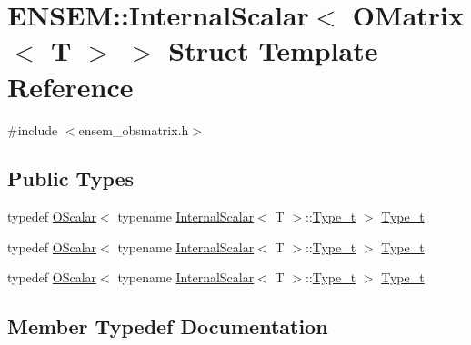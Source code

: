 \hypertarget{structENSEM_1_1InternalScalar_3_01OMatrix_3_01T_01_4_01_4}{}\section{E\+N\+S\+EM\+:\+:Internal\+Scalar$<$ O\+Matrix$<$ T $>$ $>$ Struct Template Reference}
\label{structENSEM_1_1InternalScalar_3_01OMatrix_3_01T_01_4_01_4}


{\ttfamily \#include $<$ensem\+\_\+obsmatrix.\+h$>$}

\subsection*{Public Types}
\begin{DoxyCompactItemize}
\item 
typedef \mbox{\hyperlink{classENSEM_1_1OScalar}{O\+Scalar}}$<$ typename \mbox{\hyperlink{structENSEM_1_1InternalScalar}{Internal\+Scalar}}$<$ T $>$\+::\mbox{\hyperlink{structENSEM_1_1InternalScalar_3_01OMatrix_3_01T_01_4_01_4_a1e1ab78c916da9274cc273535dd0a08a}{Type\+\_\+t}} $>$ \mbox{\hyperlink{structENSEM_1_1InternalScalar_3_01OMatrix_3_01T_01_4_01_4_a1e1ab78c916da9274cc273535dd0a08a}{Type\+\_\+t}}
\item 
typedef \mbox{\hyperlink{classENSEM_1_1OScalar}{O\+Scalar}}$<$ typename \mbox{\hyperlink{structENSEM_1_1InternalScalar}{Internal\+Scalar}}$<$ T $>$\+::\mbox{\hyperlink{structENSEM_1_1InternalScalar_3_01OMatrix_3_01T_01_4_01_4_a1e1ab78c916da9274cc273535dd0a08a}{Type\+\_\+t}} $>$ \mbox{\hyperlink{structENSEM_1_1InternalScalar_3_01OMatrix_3_01T_01_4_01_4_a1e1ab78c916da9274cc273535dd0a08a}{Type\+\_\+t}}
\item 
typedef \mbox{\hyperlink{classENSEM_1_1OScalar}{O\+Scalar}}$<$ typename \mbox{\hyperlink{structENSEM_1_1InternalScalar}{Internal\+Scalar}}$<$ T $>$\+::\mbox{\hyperlink{structENSEM_1_1InternalScalar_3_01OMatrix_3_01T_01_4_01_4_a1e1ab78c916da9274cc273535dd0a08a}{Type\+\_\+t}} $>$ \mbox{\hyperlink{structENSEM_1_1InternalScalar_3_01OMatrix_3_01T_01_4_01_4_a1e1ab78c916da9274cc273535dd0a08a}{Type\+\_\+t}}
\end{DoxyCompactItemize}


\subsection{Member Typedef Documentation}
\mbox{\label{structENSEM_1_1InternalScalar_3_01OMatrix_3_01T_01_4_01_4_a1e1ab78c916da9274cc273535dd0a08a}} 
